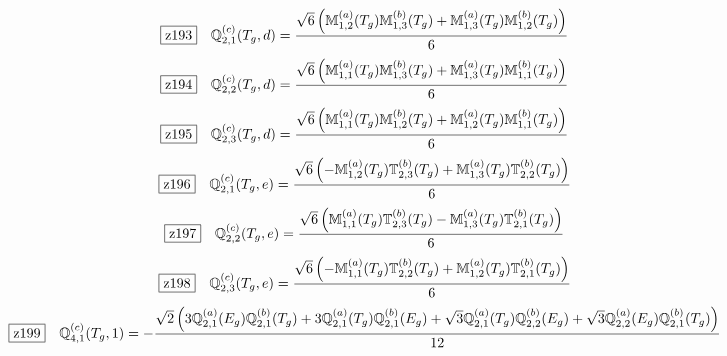 \documentclass[fleqn,10pt,landscape]{jsarticle}
\begin{document}
\begin{dmath*}
\hspace*{3mm}\fbox{z193}\quad \mathbb{Q}_{2,1}^{(c)}(T_{g},d)=\frac{\sqrt{6} \left(\mathbb{M}_{1,2}^{(a)}(T_{g}) \mathbb{M}_{1,3}^{(b)}(T_{g}) + \mathbb{M}_{1,3}^{(a)}(T_{g}) \mathbb{M}_{1,2}^{(b)}(T_{g})\right)}{6}
\end{dmath*}
\begin{dmath*}
\hspace*{3mm}\fbox{z194}\quad \mathbb{Q}_{2,2}^{(c)}(T_{g},d)=\frac{\sqrt{6} \left(\mathbb{M}_{1,1}^{(a)}(T_{g}) \mathbb{M}_{1,3}^{(b)}(T_{g}) + \mathbb{M}_{1,3}^{(a)}(T_{g}) \mathbb{M}_{1,1}^{(b)}(T_{g})\right)}{6}
\end{dmath*}
\begin{dmath*}
\hspace*{3mm}\fbox{z195}\quad \mathbb{Q}_{2,3}^{(c)}(T_{g},d)=\frac{\sqrt{6} \left(\mathbb{M}_{1,1}^{(a)}(T_{g}) \mathbb{M}_{1,2}^{(b)}(T_{g}) + \mathbb{M}_{1,2}^{(a)}(T_{g}) \mathbb{M}_{1,1}^{(b)}(T_{g})\right)}{6}
\end{dmath*}
\begin{dmath*}
\hspace*{3mm}\fbox{z196}\quad \mathbb{Q}_{2,1}^{(c)}(T_{g},e)=\frac{\sqrt{6} \left(- \mathbb{M}_{1,2}^{(a)}(T_{g}) \mathbb{T}_{2,3}^{(b)}(T_{g}) + \mathbb{M}_{1,3}^{(a)}(T_{g}) \mathbb{T}_{2,2}^{(b)}(T_{g})\right)}{6}
\end{dmath*}
\begin{dmath*}
\hspace*{3mm}\fbox{z197}\quad \mathbb{Q}_{2,2}^{(c)}(T_{g},e)=\frac{\sqrt{6} \left(\mathbb{M}_{1,1}^{(a)}(T_{g}) \mathbb{T}_{2,3}^{(b)}(T_{g}) - \mathbb{M}_{1,3}^{(a)}(T_{g}) \mathbb{T}_{2,1}^{(b)}(T_{g})\right)}{6}
\end{dmath*}
\begin{dmath*}
\hspace*{3mm}\fbox{z198}\quad \mathbb{Q}_{2,3}^{(c)}(T_{g},e)=\frac{\sqrt{6} \left(- \mathbb{M}_{1,1}^{(a)}(T_{g}) \mathbb{T}_{2,2}^{(b)}(T_{g}) + \mathbb{M}_{1,2}^{(a)}(T_{g}) \mathbb{T}_{2,1}^{(b)}(T_{g})\right)}{6}
\end{dmath*}
\begin{dmath*}
\hspace*{3mm}\fbox{z199}\quad \mathbb{Q}_{4,1}^{(c)}(T_{g},1)=- \frac{\sqrt{2} \left(3 \mathbb{Q}_{2,1}^{(a)}(E_{g}) \mathbb{Q}_{2,1}^{(b)}(T_{g}) + 3 \mathbb{Q}_{2,1}^{(a)}(T_{g}) \mathbb{Q}_{2,1}^{(b)}(E_{g}) + \sqrt{3} \mathbb{Q}_{2,1}^{(a)}(T_{g}) \mathbb{Q}_{2,2}^{(b)}(E_{g}) + \sqrt{3} \mathbb{Q}_{2,2}^{(a)}(E_{g}) \mathbb{Q}_{2,1}^{(b)}(T_{g})\right)}{12}
\end{dmath*}
\end{document}
